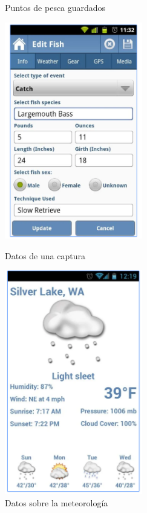 \begin{figure}[htbp]
\begin{minipage}[b]{0.5\linewidth}
\caption{Puntos de pesca guardados}
\label{fig:pesca2}
\end{minipage}
\begin{minipage}[b]{0.5\linewidth}
\centering
\includegraphics[width=6cm]{pesca3.png}

\caption{Datos de una captura}
\label{fig:pesca3}
\end{minipage}
\begin{minipage}[b]{0.5\linewidth}
\centering
\includegraphics[width=6cm]{pesca4.png}

\caption{Datos sobre la meteorología}
\label{fig:pesca4}
\end{minipage}
\end{figure}
